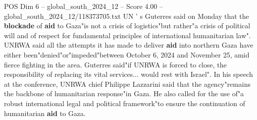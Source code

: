 \begin{textsample}{POS Dim 6 – global\_south\_2024\_12 – Score 4.00 – global\_south\_2024\_12/118373705.txt}
UN ' s Guterres said on Monday that the \textbf{blockade} of \textbf{aid} to Gaza"is not a crisis of logistics"but rather"a crisis of political will and of respect for fundamental principles of international humanitarian law".
UNRWA said all the attempts it has made to deliver \textbf{aid} into northern Gaza have either been"denied"or"impeded"between October 6, 2024 and November 25, amid fierce fighting in the area.
Guterres said"if UNRWA is forced to close, the responsibility of replacing its vital services... would rest with Israel".
In his speech at the conference, UNRWA chief Philippe Lazzarini said that the agency"remains the backbone of humanitarian response"in Gaza.
He also called for the use of"a robust international legal and political framework"to ensure the continuation of humanitarian \textbf{aid} to Gaza.

\end{textsample}
